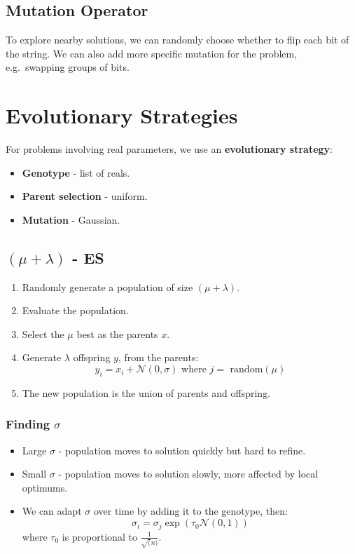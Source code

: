 \documentclass[11pt]{article}
\begin{document}
\subsection{Mutation Operator}
To explore nearby solutions, we can randomly choose whether to flip each bit of the string.
We can also add more specific mutation for the problem, e.g.\ swapping groups of bits.

\section{Evolutionary Strategies}
For problems involving real parameters, we use an \textbf{evolutionary strategy}:
\begin{itemize}
  \item \textbf{Genotype} - list of reals.
  \item \textbf{Parent selection} - uniform.
  \item \textbf{Mutation} - Gaussian.
\end{itemize}

\subsection{$(\mu + \lambda)$ - ES}
\begin{enumerate}
  \item Randomly generate a population of size $(\mu + \lambda)$.
  \item Evaluate the population.
  \item Select the $\mu$ best as the parents $x$.
  \item Generate $\lambda$ offspring $y$, from the parents:
    \[
      y_i = x_i + \mathcal{N}(0, \sigma) \text{ where } j = \text{ random}(\mu)  
    \]
  \item The new population is the union of parents and offspring.
\end{enumerate}

\subsubsection{Finding $\sigma$}
\begin{itemize}
  \item Large $\sigma$ - population moves to solution quickly but hard to refine.
  \item Small $\sigma$ - population moves to solution slowly, more affected by local optimums. 
  \item We can adapt $\sigma$ over time by adding it to the genotype, then:
      \[
        \sigma_i = \sigma_j \exp(\tau_0 \mathcal{N}(0, 1)) 
      \]
      where $\tau_0$ is proportional to $\frac{1}{\sqrt(n)}$.
\end{itemize}
\end{document}
